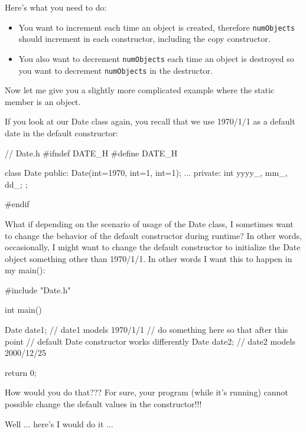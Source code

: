 Here's what you need to do:

\begin{itemize}
\item You want to increment each time an object is created, therefore
  \texttt{numObjects} should increment in each constructor, including the
  copy constructor.
\item You also want to decrement \texttt{numObjects} each time an object is
  destroyed so you want to decrement \texttt{numObjects} in the
  destructor.
\end{itemize}



\newpage{}

Now let me give you a slightly more complicated example where the static
member is an object.

If you look at our Date class again, you recall that we use 1970/1/1 as
a default date in the default constructor:

\begin{consolethree}[escapeinside=||]
// Date.h
#ifndef DATE_H
#define DATE_H

class Date
{
public:
    Date(int=1970, int=1, int=1);
    ...
private:
    int yyyy_, mm_, dd_;
};

#endif
\end{consolethree}

What if depending on the scenario of usage of the Date class, I
sometimes want to change the behavior of the default constructor during
runtime? In other words, occasionally, I might want to change the
default constructor to initialize the Date object something other than
1970/1/1. In other words I want this to happen in my main():

\begin{consolethree}[escapeinside=||]
#include "Date.h"

int main()
{
    Date date1; // date1 models 1970/1/1
    // do something here so that after this point
    // default Date constructor works differently
    Date date2; // date2 models 2000/12/25

    return 0;
}
\end{consolethree}

How would you do that??? For sure, your program (while
it's running) cannot possible change the default values
in the constructor!!!

Well ... here's I would do it ...

